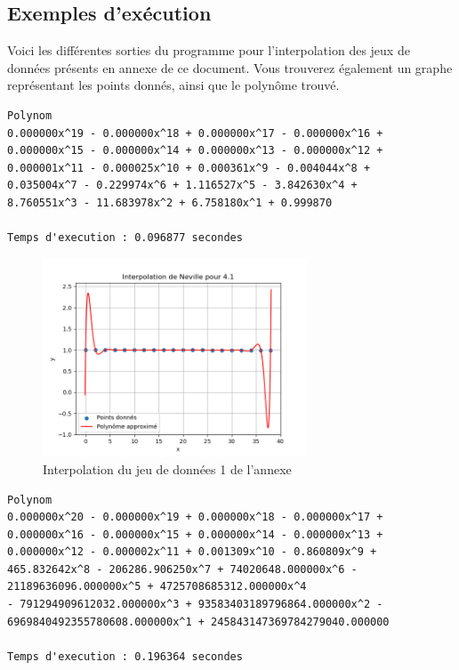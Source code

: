 \documentclass{report}
\begin{document}
\subsection{Exemples d'exécution}
Voici les différentes sorties du programme pour l'interpolation des jeux de données présents en annexe de ce document. Vous trouverez également un graphe représentant les points donnés, ainsi que le polynôme trouvé.
\begin{lstlisting}[caption={Annexe 1 data} results, basicstyle=\fontsize{8}{10}\selectfont]
    Polynom
0.000000x^19 - 0.000000x^18 + 0.000000x^17 - 0.000000x^16 + 
0.000000x^15 - 0.000000x^14 + 0.000000x^13 - 0.000000x^12 + 
0.000001x^11 - 0.000025x^10 + 0.000361x^9 - 0.004044x^8 + 
0.035004x^7 - 0.229974x^6 + 1.116527x^5 - 3.842630x^4 + 
8.760551x^3 - 11.683978x^2 + 6.758180x^1 + 0.999870

Temps d'execution : 0.096877 secondes
\end{lstlisting}
\begin{figure}[h]
    \centering
    \includegraphics[width=0.7\textwidth]{sources/Corentin/polynomApproch/results/graphs/41.png}
    \caption{Interpolation du jeu de données 1 de l'annexe}
\end{figure}
\newpage
\begin{lstlisting}[caption={Annexe 2 data} results, basicstyle=\fontsize{8}{10}\selectfont]
    Polynom
0.000000x^20 - 0.000000x^19 + 0.000000x^18 - 0.000000x^17 + 
0.000000x^16 - 0.000000x^15 + 0.000000x^14 - 0.000000x^13 + 
0.000000x^12 - 0.000002x^11 + 0.001309x^10 - 0.860809x^9 + 
465.832642x^8 - 206286.906250x^7 + 74020648.000000x^6 - 
21189636096.000000x^5 + 4725708685312.000000x^4 
- 791294909612032.000000x^3 + 93583403189796864.000000x^2 - 
6969840492355780608.000000x^1 + 245843147369784279040.000000

Temps d'execution : 0.196364 secondes
\end{lstlisting}
\end{document}
